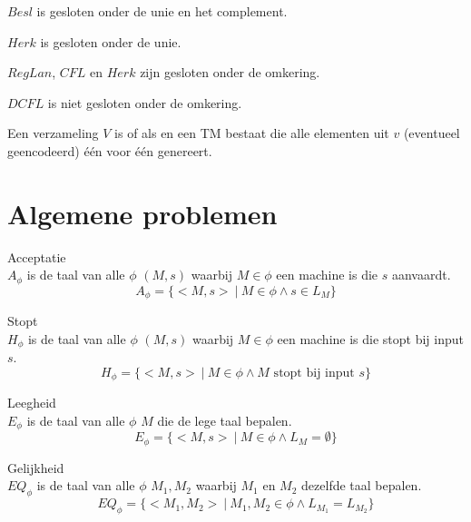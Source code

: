 \documentclass[main.tex]{subfiles}
\begin{document}
\begin{st}
  $Besl$ is gesloten onder de unie en het complement.
\end{st}

\begin{st}
  $Herk$ is gesloten onder de unie.
\end{st}

\begin{st}
  $RegLan$, $CFL$ en $Herk$ zijn gesloten onder de omkering.
\end{st}

\begin{st}
  $DCFL$ is niet gesloten onder de omkering.
\end{st}

\begin{de}
  Een verzameling $V$ is  of  als en een TM bestaat die alle elementen uit $v$ (eventueel geencodeerd) \'e\'en voor \'e\'en genereert.
\end{de}

\section{Algemene problemen}
\label{sec:algemene-problemen}

\begin{de}
  Acceptatie\\
  $A_{\phi}$ is de taal van alle $\phi$ $(M,s)$ waarbij $M\in \phi$ een machine is die $s$ aanvaardt.
  \[ A_{\phi} = \{ <M,s> \ |\ M\in \phi \wedge s \in L_{M} \} \]
\end{de}

\begin{de}
  Stopt\\
  $H_{\phi}$ is de taal van alle $\phi$ $(M,s)$ waarbij $M\in \phi$ een machine is die stopt bij input $s$.
  \[ H_{\phi} = \{ <M,s> \ |\ M \in \phi \wedge M \text{ stopt bij input } s \} \]
\end{de}

\begin{de}
  Leegheid\\
  $E_{\phi}$ is de taal van alle $\phi$ $M$ die de lege taal bepalen.
  \[ E_{\phi} = \{ <M,s>\ |\ M \in \phi \wedge L_{M} = \emptyset \} \]
\end{de}

\begin{de}
  Gelijkheid\\
  $EQ_{\phi}$ is de taal van alle $\phi$ $M_{1},M_{2}$ waarbij $M_{1}$ en $M_{2}$ dezelfde taal bepalen.
  \[ EQ_{\phi} = \{ <M_{1},M_{2}> \ |\ M_{1},M_{2} \in \phi \wedge L_{M_{1}} = L_{M_{2}} \} \]
\end{de}
\end{document}
